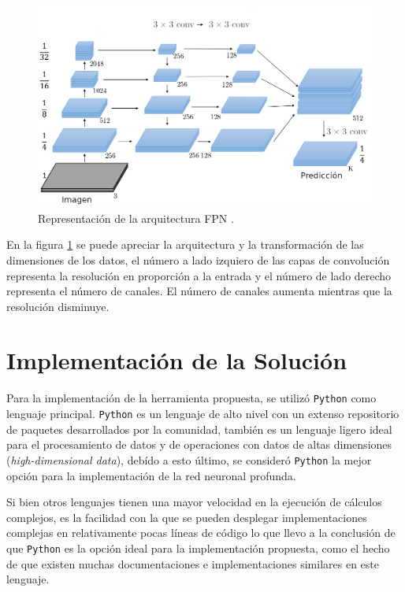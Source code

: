 \begin{figure}[h]
    \centering
    \includegraphics[scale=0.55]{Figuras/fpn_ar_esp_2.png}
    \caption{Representación de la arquitectura FPN \citep{fpn_2}.}
    \label{fig:fpn_map}
\end{figure}

En la figura \ref{fig:fpn_map} se puede apreciar la arquitectura y la transformación de las dimensiones de los datos, el número a lado izquiero de las capas de convolución representa la resolución en proporción a la entrada y el número de lado derecho representa el número de canales. El número de canales aumenta mientras que la resolución disminuye.

\section{Implementación de la Solución}
Para la implementación de la herramienta propuesta, se utilizó \texttt{Python} como lenguaje principal. \texttt{Python} es un lenguaje de alto nivel con un extenso repositorio de paquetes desarrollados por la comunidad, también es un lenguaje ligero ideal para el procesamiento de datos y de operaciones con datos de altas dimensiones (\emph{high-dimensional data}), debído a esto último, se consideró \texttt{Python} la mejor opción para la implementación de la red neuronal profunda.

Si bien otros lenguajes tienen una mayor velocidad en la ejecución de cálculos complejos, es la facilidad con la que se pueden desplegar implementaciones complejas en relativamente pocas líneas de código lo que llevo a la conclusión de que \texttt{Python} es la opción ideal para la implementación propuesta, como el hecho de que existen muchas documentaciones e implementaciones similares en este lenguaje.

